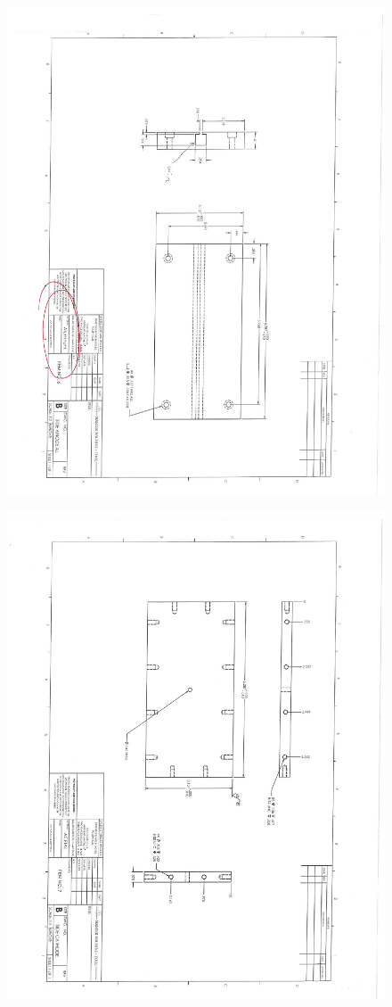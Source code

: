 \begin{figure}[h!]
	\centering
	\includegraphics[width=0.9\linewidth]{figures/dms/DMS_drawings_06.pdf}
\end{figure}

\begin{figure}[h!]
	\centering
	\includegraphics[width=0.9\linewidth]{figures/dms/DMS_drawings_07.pdf}
\end{figure}

